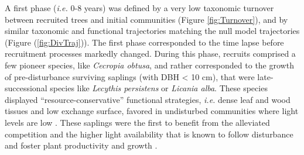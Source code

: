 \documentclass[fleqn,10pt]{ArtEcoFoG} %
\begin{document}
A first phase (\emph{i.e.} 0-8 years) was defined by a very low taxonomic turnover between recruited trees and initial communities (Figure \ref{fig:Turnover}), and by similar taxonomic and functional trajectories matching the null model trajectories (Figure (\ref{fig:DivTraj})).
The first phase corresponded to the time lapse before recruitment processes markedly changed.
During this phase, recruits comprised a few pioneer species, like \emph{Cecropia obtusa}, and rather corresponded to the growth of pre-disturbance surviving saplings (with DBH \textless{} 10 cm), that were late-successional species like \emph{Lecythis persistens} or \emph{Licania alba}.
These species displayed ``resource-conservative'' functional strategies, \emph{i.e.} dense leaf and wood tissues and low exchange surface, favored in undisturbed communities where light levels are low \citep{Peet1992, Denslow2000}.
These saplings were the first to benefit from the alleviated competition and the higher light availability that is known to follow disturbance and foster plant productivity and growth \citep{Monteith1972, Chazdon1984}.
\end{document}
